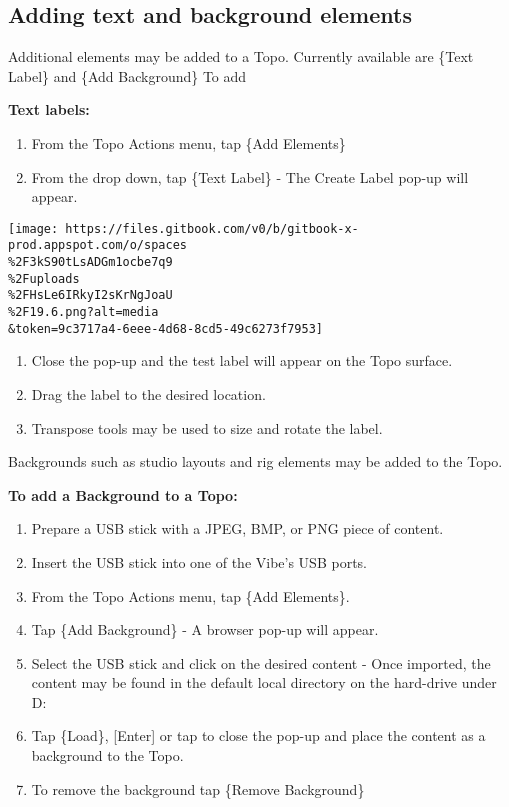 \documentclass[
]{article}
\begin{document}
\hypertarget{adding-text-and-background-elements}{%
\subsection{Adding text and background elements}\label{adding-text-and-background-elements}}

Additional elements may be added to a Topo. Currently available are \{Text Label\} and \{Add Background\} To add

\textbf{Text labels:}

\begin{enumerate}
\def\labelenumi{\arabic{enumi}.}
\item
  From the Topo Actions menu, tap \{Add Elements\}
\item
  From the drop down, tap \{Text Label\} - The Create Label pop-up will appear.
\end{enumerate}

\texttt{[image: https://files.gitbook.com/v0/b/gitbook-x-prod.appspot.com/o/spaces\\\%2F3kS90tLsADGm1ocbe7q9\\\%2Fuploads\\\%2FHsLe6IRkyI2sKrNgJoaU\\\%2F19.6.png?alt=media\\\&token=9c3717a4-6eee-4d68-8cd5-49c6273f7953]}

\begin{enumerate}
\def\labelenumi{\arabic{enumi}.}
\setcounter{enumi}{2}
\item
  Close the pop-up and the test label will appear on the Topo surface.
\item
  Drag the label to the desired location.
\item
  Transpose tools may be used to size and rotate the label.
\end{enumerate}

Backgrounds such as studio layouts and rig elements may be added to the Topo.

\textbf{To add a Background to a Topo:}

\begin{enumerate}
\def\labelenumi{\arabic{enumi}.}
\item
  Prepare a USB stick with a JPEG, BMP, or PNG piece of content.
\item
  Insert the USB stick into one of the Vibe's USB ports.
\item
  From the Topo Actions menu, tap \{Add Elements\}.
\item
  Tap \{Add Background\} - A browser pop-up will appear.
\item
  Select the USB stick and click on the desired content - Once imported, the content may be found in the default local directory on the hard-drive under D:\Vibe\Compulite\WorkDir\show\Images\Topo\\
\item
  Tap \{Load\}, {[}Enter{]} or tap to close the pop-up and place the content as a background to the Topo.
\item
  To remove the background tap \{Remove Background\}
\end{enumerate}
\end{document}
